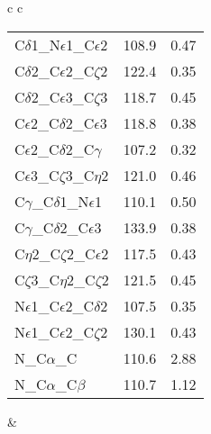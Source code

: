 \begin{longtable}{ c c }
\begin{tabular}{ l l l }
  C$\delta$1\_N$\epsilon$1\_C$\epsilon$2 & 108.9 & 0.47\\
  C$\delta$2\_C$\epsilon$2\_C$\zeta$2 & 122.4 & 0.35\\
  C$\delta$2\_C$\epsilon$3\_C$\zeta$3 & 118.7 & 0.45\\
  C$\epsilon$2\_C$\delta$2\_C$\epsilon$3 & 118.8 & 0.38\\
  C$\epsilon$2\_C$\delta$2\_C$\gamma$ & 107.2 & 0.32\\
  C$\epsilon$3\_C$\zeta$3\_C$\eta$2 & 121.0 & 0.46\\
  C$\gamma$\_C$\delta$1\_N$\epsilon$1 & 110.1 & 0.50\\
  C$\gamma$\_C$\delta$2\_C$\epsilon$3 & 133.9 & 0.38\\
  C$\eta$2\_C$\zeta$2\_C$\epsilon$2 & 117.5 & 0.43\\
  C$\zeta$3\_C$\eta$2\_C$\zeta$2 & 121.5 & 0.45\\
  N$\epsilon$1\_C$\epsilon$2\_C$\delta$2 & 107.5 & 0.35\\
  N$\epsilon$1\_C$\epsilon$2\_C$\zeta$2 & 130.1 & 0.43\\
  N\_C$\alpha$\_C & 110.6 & 2.88\\
  N\_C$\alpha$\_C$\beta$ & 110.7 & 1.12\\
  \bottomrule
  \end{tabular}
  &
  \\
  
\end{longtable}

\newpage

